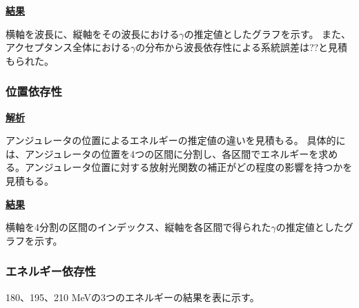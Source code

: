 \documentclass[a4paper,11pt,uplatex]{jsbook}
\begin{document}
\noindent \textbf{\underline{結果}}\par
横軸を波長に、縦軸をその波長における$\gamma$の推定値としたグラフを示す。
また、アクセプタンス全体における$\gamma$の分布から波長依存性による系統誤差は??と見積もられた。
\subsubsection{位置依存性}
\noindent \textbf{\underline{解析}}\par
アンジュレータの位置によるエネルギーの推定値の違いを見積もる。
具体的には、アンジュレータの位置を4つの区間に分割し、各区間でエネルギーを求める。アンジュレータ位置に対する放射光関数の補正がどの程度の影響を持つかを見積もる。

\noindent \textbf{\underline{結果}}\par
横軸を4分割の区間のインデックス、縦軸を各区間で得られた$\gamma$の推定値としたグラフを示す。


\subsubsection{エネルギー依存性}
180、195、210 MeVの3つのエネルギーの結果を表に示す。
\end{document}
